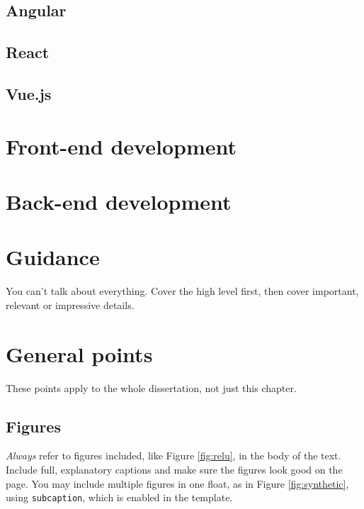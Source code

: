 \documentclass{l4proj}
\begin{document}
\subsection{Angular}
\subsection{React}
\subsection{Vue.js}
\section{Front-end development}
\section{Back-end development}
\section{Guidance}
You can't talk about everything. Cover the high level first, then cover important, relevant or impressive details.

\section{General points}
These points apply to the whole dissertation, not just this chapter.

\subsection{Figures}
\emph{Always} refer to figures included, like Figure \ref{fig:relu}, in the body of the text. Include full, explanatory captions and make sure the figures look good on the page.
You may include multiple figures in one float, as in Figure \ref{fig:synthetic}, using \texttt{subcaption}, which is enabled in the template.
\end{document}
